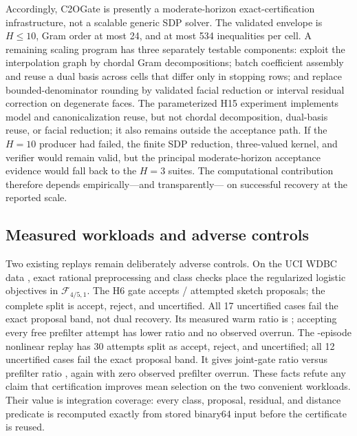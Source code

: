 \documentclass[smallextended]{svjour3}
\newcommand{\cF}{\mathcal{F}}
\begin{document}
Accordingly, C2OGate is presently a moderate-horizon exact-certification
infrastructure, not a scalable generic SDP solver.  The validated envelope is
$H\leq10$, Gram order at most 24, and at most 534 inequalities per cell.  A
remaining scaling program has three separately testable components: exploit the
interpolation graph by chordal Gram decompositions; batch coefficient assembly
and reuse a dual basis across cells that differ only in stopping rows; and
replace bounded-denominator rounding by validated facial reduction or interval
residual correction on degenerate faces.  The parameterized H15 experiment
implements model and canonicalization reuse, but not chordal decomposition,
dual-basis reuse, or facial reduction; it also remains outside the acceptance
path.  If the $H=10$ producer had
failed, the finite SDP reduction,
three-valued kernel, and verifier would remain valid, but the principal
moderate-horizon acceptance evidence would fall back to the $H=3$ suites.  The
computational contribution therefore depends empirically---and transparently---
on successful recovery at the reported scale.

\subsection{Measured workloads and adverse controls}
\label{sec:measured-workloads}

Two existing replays remain deliberately adverse controls.  On the UCI WDBC
data \citep{UCIWDBC1993}, exact rational preprocessing and class checks place
the regularized logistic objectives in $\cF_{4/5,1}$.  The H6 gate accepts
\UciWdbcAccepted{}/\UciWdbcAttempts{} attempted sketch proposals; the complete
split is \UciWdbcAccepted{} accept, \UciWdbcRejected{} reject, and
\UciWdbcUncertified{} uncertified.  All 17 uncertified cases fail the exact
proposal band, not dual recovery.  Its
measured warm ratio is \UciWdbcMeasuredWarmRatio{}; accepting every free
prefilter attempt has lower ratio \UciWdbcGreedyMeasuredRatio{} and no observed
overrun.  The \RollingLogisticEpisodes{}-episode nonlinear replay has 30
attempts split as \RollingLogisticAccepted{} accept,
\RollingLogisticRejected{} reject, and \RollingLogisticUncertified{}
uncertified; all 12 uncertified cases fail the exact proposal band.  It gives
joint-gate ratio \RollingLogisticWarmRatio{} versus prefilter ratio
\RollingLogisticGreedyRatio{}, again with zero observed prefilter overrun.
These facts refute any claim that certification improves mean selection on the
two convenient workloads.  Their value is integration coverage: every class,
proposal, residual, and distance predicate is recomputed exactly from stored
binary64 input before the certificate is reused.
\end{document}
